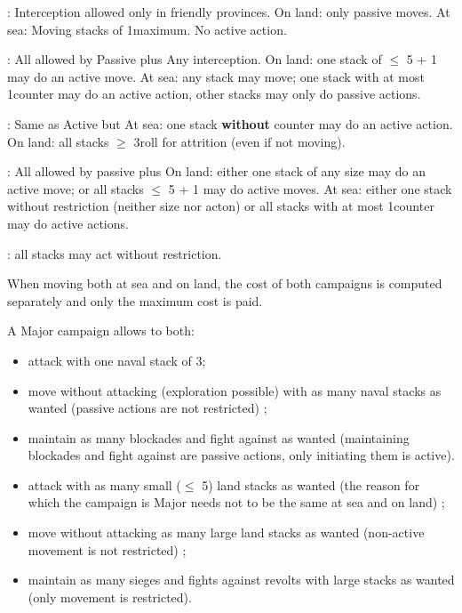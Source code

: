 \ducats:
\bparag Interception allowed only in friendly provinces.
\bparag On land: only passive moves.
\bparag At sea: Moving stacks of 1\FLEET maximum. No active action.

\ducats: All allowed by Passive plus
\bparag Any interception.
\bparag On land: one stack of $\leq$ 5 \LD + 1 \Pasha may do an active move.
\bparag At sea: any stack may move; one stack with at most 1\FLEET counter
may do an active action, other stacks may only do passive actions.

\ducats: Same as Active but
\bparag At sea: one stack \textbf{without} \FLEET counter may do an active
action.
\bparag On land: all stacks $\geq$ 3\LD roll for attrition (even if not
moving).

\ducats: All allowed by passive plus
\bparag On land: either one stack of any size may do an active move;
or all stacks $\leq$ 5 \LD + 1 \Pasha may do active moves.
\bparag At sea: either one stack without restriction (neither size nor acton)
or all stacks with at most 1\FLEET counter may do active actions.

\ducats: all stacks may act without restriction.

\aparag When moving both at sea and on land, the cost of both campaigns is
computed separately and only the maximum cost is paid.

\begin{exemple}
  A Major campaign allows to both:
  \begin{itemize}
  \item attack with one naval stack of 3\FLEET ;
  \item move without attacking (exploration possible) with as many naval
    stacks as wanted (passive actions are not restricted) ;
  \item maintain as many blockades and fight against \corsaire as wanted
    (maintaining blockades and fight against \corsaire are passive actions,
    only initiating them is active).
  \item attack with as many small ($\leq$ 5\LD) land stacks as wanted (the
    reason for which the campaign is Major needs not to be the same at sea and
    on land) ;
  \item move without attacking as many large land stacks as wanted
    (non-active movement is not restricted) ;
  \item maintain as many sieges and fights against revolts with large stacks as
    wanted (only movement is restricted).
  \end{itemize}
\end{exemple}

